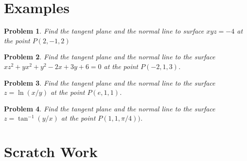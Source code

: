 \documentclass[11pt]{article}
\newtheorem{problem}{Problem}
\begin{document}
\section{Examples}

\begin{problem}
    Find the tangent plane and the normal line to surface $xyz = -4$ at the point $P(2,-1,2)$
\end{problem}

\newpage

\begin{problem}
    Find the tangent plane and the normal line to the surface $xz^2+yx^2+y^2-2x+3y+6 = 0$ at the point $P(-2,1,3)$.
\end{problem}

\vspace{6 cm}


\begin{problem}
    Find the tangent plane and the normal line to the surface $z = \ln{(x/y)}$ at the point $P(e,1,1)$.
\end{problem}

\vspace{6 cm}


\begin{problem}
    Find the tangent plane and the normal line to the surface $z = \tan^{-1}(y/x)$ at the point $P(1,1,\pi/4))$.
\end{problem}



\newpage

\section{Scratch Work}
\end{document}
